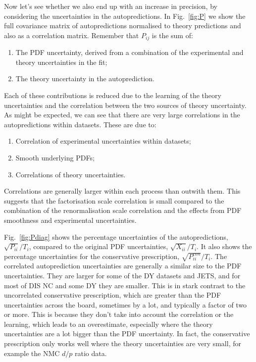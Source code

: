 Now let's see whether we also end up with an increase in precision, by considering the uncertainties in the autopredictions. In Fig.~\ref{fig:P} we show the full covariance matrix of autopredictions normalised to theory predictions and also as a correlation matrix. Remember that $P_{ij}$ is the sum of:
\begin{enumerate}
\item The PDF uncertainty, derived from a combination of the experimental and theory uncertainties in the fit;
\item The theory uncertainty in the autoprediction.
\end{enumerate}
Each of these contributions is reduced due to the learning of the theory uncertainties and the correlation between the two sources of theory uncertainty. As might be expected, we can see that there are very large correlations in the autopredictions within datasets. These are due to:
\begin{enumerate}
\item Correlation of experimental uncertainties within datasets;
\item Smooth underlying PDFs;
\item Correlations of theory uncertainties.
\end{enumerate}
Correlations are generally larger within each process than outwith them. This suggests that the factorisation scale correlation is small compared to the combination of the renormalisation scale correlation and the effects from PDF smoothness and experimental uncertainties.

Fig.~\ref{fig:Pdiag} shows the percentage uncertainties of the autopredictions, $\sqrt{P_{ii}}/T_i$, compared to the original PDF uncertainties, $\sqrt{X_{ii}}/T_i$. It also shows the percentage uncertainties for the conservative prescription, $\sqrt{P^{con}_{ii}}/T_i$. The correlated autoprediction uncertainties are generally a similar size to the PDF uncertainties. They are larger for some of the DY datasets and JETS, and for most of DIS NC and some DY they are smaller. This is in stark contrast to the uncorrelated conservative prescription, which are greater than the PDF uncertainties across the board, sometimes by a lot, and typically a factor of two or more. This is because they don't take into account the correlation or the learning, which leads to an overestimate, especially where the theory uncertainties are a lot bigger than the PDF uncertainty. In fact, the conservative prescription only works well where the theory uncertainties are very small, for example the NMC $d/p$ ratio data. 

